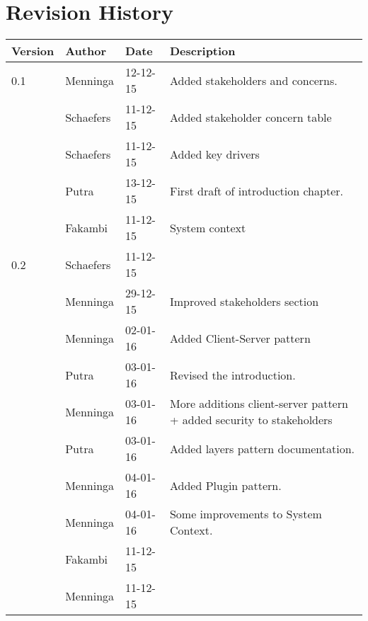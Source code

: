 \section*{Revision History}
\begin{longtable}{L{} L{} L{} L{}}
	\textbf{Version} & \textbf{Author}       & \textbf{Date} & \textbf{Description}                                                                                                                                                                                                       \\ \endhead	\toprule
				0.1 & Menninga  & 12-12-15 & Added stakeholders and concerns. \\
					& Schaefers & 11-12-15 & Added stakeholder concern table\\
					& Schaefers & 11-12-15 & Added key drivers\\
					& Putra		& 13-12-15 & First draft of introduction chapter. \\
					& Fakambi   & 11-12-15 & System context\\
				\midrule
			
				0.2 & Schaefers & 11-12-15 & \\
					& Menninga  & 29-12-15 & Improved stakeholders section \\
					& Menninga  & 02-01-16 & Added Client-Server pattern \\
					& Putra		& 03-01-16 & Revised the introduction. \\
					& Menninga  & 03-01-16 & More additions client-server pattern + added security to stakeholders \\
					& Putra		& 03-01-16 & Added layers pattern documentation. \\
					& Menninga	& 04-01-16 & Added Plugin pattern. \\
					& Menninga  & 04-01-16 & Some improvements to System Context. \\
					& Fakambi   & 11-12-15 & \\
					& Menninga  & 11-12-15 & \\
				\midrule

%			
\end{longtable}